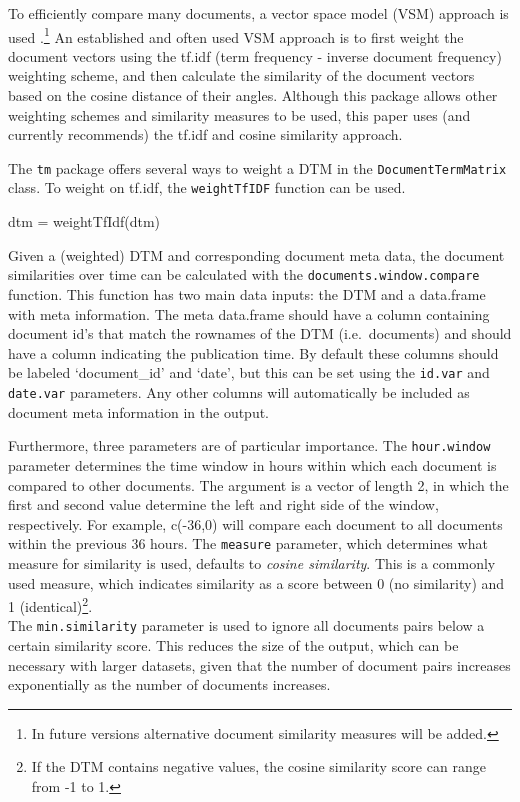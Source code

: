 To efficiently compare many documents, a vector space model (VSM)
approach is used \citep{salton75, salton03}.\footnote{In future versions
  alternative document similarity measures will be added.} An
established and often used VSM approach is to first weight the document
vectors using the tf.idf (term frequency - inverse document frequency)
weighting scheme, and then calculate the similarity of the document
vectors based on the cosine distance of their angles. Although this
package allows other weighting schemes and similarity measures to be
used, this paper uses (and currently recommends) the tf.idf and cosine
similarity approach.

The \texttt{tm} package offers several ways to weight a DTM in the
\texttt{DocumentTermMatrix} class. To weight on tf.idf, the
\texttt{weightTfIDF} function can be used.

\begin{Schunk}
\begin{Sinput}
dtm = weightTfIdf(dtm)
\end{Sinput}
\end{Schunk}

Given a (weighted) DTM and corresponding document meta data, the
document similarities over time can be calculated with the
\texttt{documents.window.compare} function. This function has two main
data inputs: the DTM and a data.frame with meta information. The meta
data.frame should have a column containing document id's that match the
rownames of the DTM (i.e.~documents) and should have a column indicating
the publication time. By default these columns should be labeled
`document\_id' and `date', but this can be set using the \texttt{id.var}
and \texttt{date.var} parameters. Any other columns will automatically
be included as document meta information in the output.

Furthermore, three parameters are of particular importance. The
\texttt{hour.window} parameter determines the time window in hours
within which each document is compared to other documents. The argument
is a vector of length 2, in which the first and second value determine
the left and right side of the window, respectively. For example,
c(-36,0) will compare each document to all documents within the previous
36 hours. The \texttt{measure} parameter, which determines what measure
for similarity is used, defaults to \emph{cosine similarity}. This is a
commonly used measure, which indicates similarity as a score between 0
(no similarity) and 1 (identical)\footnote{If the DTM contains negative
  values, the cosine similarity score can range from -1 to 1.}.\\The
\texttt{min.similarity} parameter is used to ignore all documents pairs
below a certain similarity score. This reduces the size of the output,
which can be necessary with larger datasets, given that the number of
document pairs increases exponentially as the number of documents
increases.


